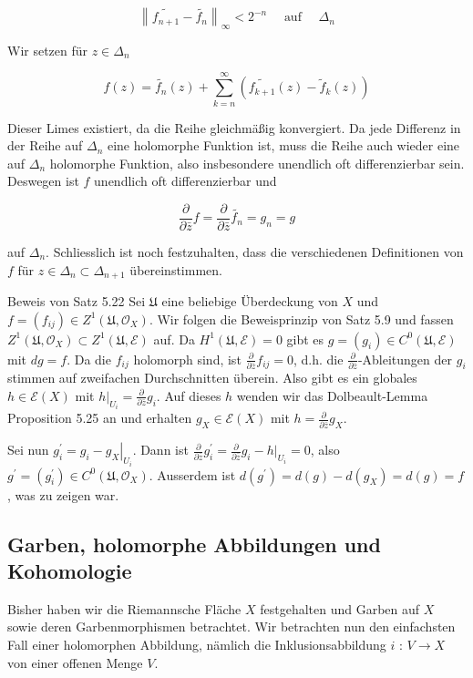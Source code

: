 \documentclass[10pt, letterpaper]{article}
\begin{document}
$$
\left\|\widetilde{f_{n+1}}-\widetilde{f_{n}}\right\|_{\infty}<2^{-n} \quad \text { auf } \quad \Delta_{n}
$$

Wir setzen für $z \in \Delta_{n}$

$$
f(z)=\widetilde{f_{n}}(z)+\sum_{k=n}^{\infty}\left(\widetilde{f_{k+1}}(z)-\widetilde{f}_{k}(z)\right)
$$

Dieser Limes existiert, da die Reihe gleichmäßig konvergiert. Da jede Differenz in der Reihe auf $\Delta_{n}$ eine holomorphe Funktion ist, muss die Reihe auch wieder eine auf $\Delta_{n}$ holomorphe Funktion, also insbesondere unendlich oft differenzierbar sein. Deswegen ist $f$ unendlich oft differenzierbar und

$$
\frac{\partial}{\partial \bar{z}} f=\frac{\partial}{\partial \bar{z}} \widetilde{f_{n}}=g_{n}=g
$$

auf $\Delta_{n}$. Schliesslich ist noch festzuhalten, dass die verschiedenen Definitionen von $f$ für $z \in \Delta_{n} \subset \Delta_{n+1}$ übereinstimmen.

Beweis von Satz 5.22 Sei $\mathfrak{U}$ eine beliebige Überdeckung von $X$ und $f= \left(f_{i j}\right) \in Z^{1}\left(\mathfrak{U}, \mathcal{O}_{X}\right)$. Wir folgen die Beweisprinzip von Satz 5.9 und fassen $Z^{1}\left(\mathfrak{U}, \mathcal{O}_{X}\right) \subset Z^{1}(\mathfrak{U}, \mathcal{E})$ auf. Da $H^{1}(\mathfrak{U}, \mathcal{E})=0$ gibt es $g=\left(g_{i}\right) \in C^{0}(\mathfrak{U}, \mathcal{E})$ mit $d g=f$. Da die $f_{i j}$ holomorph sind, ist $\frac{\partial}{\partial \bar{z}} f_{i j}=0$, d.h. die $\frac{\partial}{\partial \bar{z}}$-Ableitungen der $g_{i}$ stimmen auf zweifachen Durchschnitten überein. Also gibt es ein globales $h \in \mathcal{E}(X)$ mit $\left.h\right|_{U_{i}}=\frac{\partial}{\partial \bar{z}} g_{i}$. Auf dieses $h$ wenden wir das Dolbeault-Lemma Proposition 5.25 an und erhalten $g_{X} \in \mathcal{E}(X)$ mit $h=\frac{\partial}{\partial \bar{z}} g_{X}$.

Sei nun $g_{i}^{\prime}=g_{i}-\left.g_{X}\right|_{U_{i}}$. Dann ist $\frac{\partial}{\partial \bar{z}} g_{i}^{\prime}=\frac{\partial}{\partial \bar{z}} g_{i}-\left.h\right|_{U_{i}}=0$, also $g^{\prime}=\left(g_{i}^{\prime}\right) \in C^{0}\left(\mathfrak{U}, \mathcal{O}_{X}\right)$. Ausserdem ist $d\left(g^{\prime}\right)=d(g)-d\left(g_{X}\right)=d(g)=f$, was zu zeigen war.

\subsection {Garben, holomorphe Abbildungen und Kohomologie}
Bisher haben wir die Riemannsche Fläche $X$ festgehalten und Garben auf $X$ sowie deren Garbenmorphismen betrachtet. Wir betrachten nun den einfachsten Fall einer holomorphen Abbildung, nämlich die Inklusionsabbildung $i$ : $V \rightarrow X$ von einer offenen Menge $V$.
\end{document}
